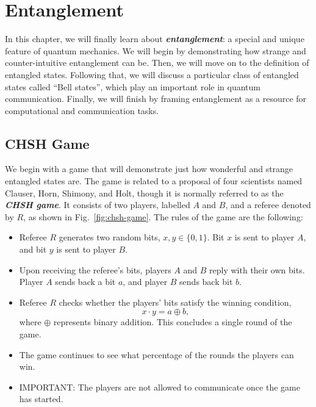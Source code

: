 \chapter{Entanglement}
\label{sec:4_entanglement}

In this chapter, we will finally learn about \textbf{\emph{entanglement}}: a special and unique feature of quantum mechanics.
We will begin by demonstrating how strange and counter-intuitive entanglement can be.
Then, we will move on to the definition of entangled states.
Following that, we will discuss a particular class of entangled states called ``Bell states'', which play an important role in quantum communication.
Finally, we will finish by framing entanglement as a resource for computational and communication tasks.


\section{CHSH Game}
\label{sec:chsh-game}

We begin with a game that will demonstrate just how wonderful and strange entangled states are.
The game is related to a proposal of four scientists named Clauser, Horn, Shimony, and Holt, though it is normally referred to as the \textbf{\emph{CHSH game}}.
It consists of two players, labelled $A$ and $B$, and a referee denoted by $R$, as shown in Fig.~\ref{fig:chsh-game}.
The rules of the game are the following:
\begin{itemize}
    \item Referee $R$ generates two random bits, $x,y\in\{0,1\}$. Bit $x$ is sent to player $A$, and bit $y$ is sent to player $B$.
    \item Upon receiving the referee's bits, players $A$ and $B$ reply with their own bits. Player $A$ sends back a bit $a$, and player $B$ sends back bit $b$.
    \item Referee $R$ checks whether the players' bits satisfy the winning condition,
    \begin{equation}
        x\cdot y = a \oplus b,
    \end{equation}
    where $\oplus$ represents binary addition. This concludes a single round of the game.
    \item The game continues to see what percentage of the rounds the players can win.
    \item IMPORTANT: The players are not allowed to communicate once the game has started.
\end{itemize}

